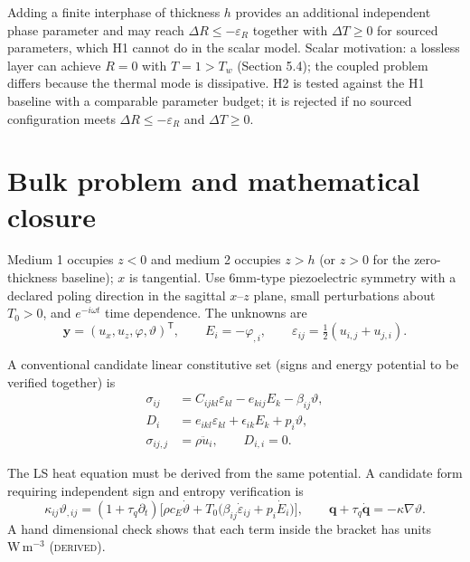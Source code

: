 \documentclass[11pt]{article}
\begin{document}
Adding a finite interphase of thickness $h$ provides an additional independent
phase parameter and may reach $\Delta R\le-\varepsilon_R$ together with
$\Delta T\ge0$ for sourced parameters, which H1 cannot do in the scalar model.
Scalar motivation: a lossless layer can achieve $R=0$ with $T=1>T_w$
(Section 5.4); the coupled problem differs because the thermal mode is
dissipative. H2 is tested against the H1 baseline with a comparable parameter
budget; it is rejected if no sourced configuration meets
$\Delta R\le-\varepsilon_R$ and $\Delta T\ge0$.

\section{Bulk problem and mathematical closure}

Medium 1 occupies $z<0$ and medium 2 occupies $z>h$ (or $z>0$ for the
zero-thickness baseline); $x$ is tangential. Use 6mm-type piezoelectric symmetry
with a declared poling direction in the sagittal $x$--$z$ plane, small
perturbations about $T_0>0$, and $e^{-i\omega t}$ time dependence. The unknowns
are
\begin{equation}
  \bm{y} = (u_x, u_z, \varphi, \vartheta)^{\mathsf T}, \qquad
  E_i = -\varphi_{,i}, \qquad
  \varepsilon_{ij} = \tfrac12(u_{i,j}+u_{j,i}).
  \tag{1}
\end{equation}

A conventional candidate linear constitutive set (signs and energy potential to be
verified together) is
\begin{align}
  \sigma_{ij} &= C_{ijkl}\varepsilon_{kl} - e_{kij}E_k - \beta_{ij}\vartheta,
  \tag{2}\\
  D_i &= e_{ikl}\varepsilon_{kl} + \epsilon_{ik}E_k + p_i\vartheta, \tag{3}\\
  \sigma_{ij,j} &= \rho\ddot u_i, \qquad D_{i,i} = 0 . \tag{4}
\end{align}

The LS heat equation must be derived from the same potential. A candidate form
requiring independent sign and entropy verification is
\begin{equation}
  \kappa_{ij}\vartheta_{,ij} = (1+\tau_q\partial_t)\Big[\rho c_E\dot\vartheta
  + T_0\big(\beta_{ij}\dot\varepsilon_{ij} + p_i\dot E_i\big)\Big],
  \qquad \bm{q} + \tau_q\dot{\bm{q}} = -\kappa\nabla\vartheta . \tag{5}
\end{equation}
A hand dimensional check shows that each term inside the bracket has units
$\mathrm{W\,m^{-3}}$ (\textsc{derived}).
\end{document}
